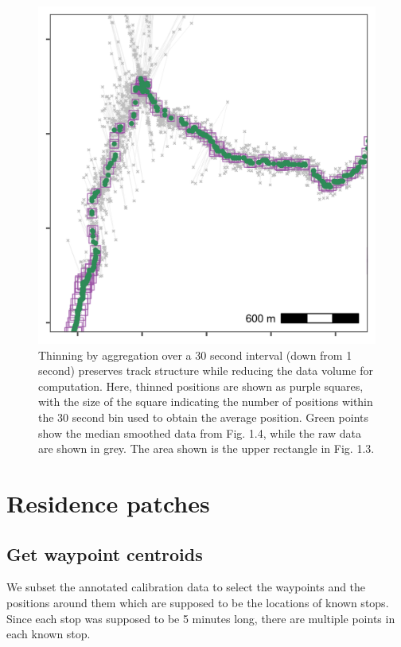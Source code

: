 \documentclass[]{scrreprt}
\begin{document}
\begin{figure}
\centering
\includegraphics{figures/fig_calib_smooth_thin.png}
\caption{Thinning by aggregation over a 30 second interval (down from 1 second) preserves track structure while reducing the data volume for computation. Here, thinned positions are shown as purple squares, with the size of the square indicating the number of positions within the 30 second bin used to obtain the average position. Green points show the median smoothed data from Fig. 1.4, while the raw data are shown in grey. The area shown is the upper rectangle in Fig. 1.3.}
\end{figure}

\hypertarget{residence-patches}{%
\section{Residence patches}\label{residence-patches}}

\hypertarget{get-waypoint-centroids}{%
\subsection{Get waypoint centroids}\label{get-waypoint-centroids}}

We subset the annotated calibration data to select the waypoints and the positions around them which are supposed to be the locations of known stops. Since each stop was supposed to be 5 minutes long, there are multiple points in each known stop.
\end{document}
